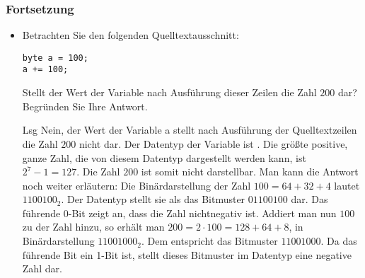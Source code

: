 \begin{frame}[fragile]%
  \frametitle{Fortsetzung}%
\centering
\medskip

\begin{itemize}
\item
Betrachten Sie den folgenden Quelltextausschnitt:
\begin{verbatim}
byte a = 100;
a += 100;
\end{verbatim}
Stellt der Wert der Variable  nach Ausführung dieser Zeilen die Zahl $200$ dar?
Begründen Sie Ihre Antwort.

\item[Lsg]
Nein, der Wert der Variable a stellt nach Ausführung der Quelltextzeilen die Zahl $200$ nicht dar.
Der Datentyp der Variable ist .
Die größte positive, ganze Zahl, die von diesem Datentyp dargestellt werden kann, ist $2^7 - 1 = 127$. Die Zahl $200$ ist somit nicht darstellbar.
Man kann die Antwort noch weiter erläutern: Die Binärdarstellung der Zahl $100 = 64 + 32 + 4$ lautet $1100100_2$.
Der Datentyp  stellt sie als das Bitmuster $01100100$ dar.
Das führende 0-Bit zeigt an, dass die Zahl nichtnegativ ist.
Addiert man nun $100$ zu der Zahl hinzu, so erhält man $200 = 2 \cdot 100 = 128 + 64 + 8$, in Binärdarstellung $11001000_2$.
Dem entspricht das Bitmuster $11001000$.
Da das führende Bit ein 1-Bit ist, stellt dieses Bitmuster im Datentyp  eine negative Zahl dar.
\end{itemize}
\end{frame}
